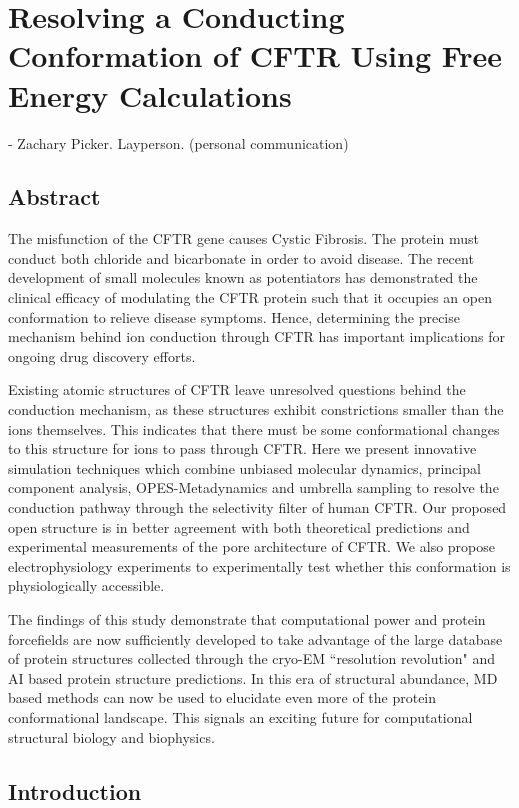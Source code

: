 \chapter{Resolving a Conducting Conformation of CFTR Using Free Energy Calculations}
\label{chap:opening}
\setcounter{figure}{0}
\renewcommand{\thefigure}{\arabic{chapter}.\arabic{figure}}
 {- Zachary Picker. Layperson. (personal communication)}


\section*{\centering Abstract} 
The misfunction of the CFTR gene causes Cystic Fibrosis. The protein must conduct both chloride and bicarbonate in order to avoid disease. The recent development of small molecules known as potentiators has demonstrated the clinical efficacy of modulating the CFTR protein such that it occupies an open conformation to relieve disease symptoms. Hence, determining the precise mechanism behind ion conduction through CFTR has important implications for ongoing drug discovery efforts.

Existing atomic structures of CFTR leave unresolved questions behind the conduction mechanism, as these structures exhibit constrictions smaller than the ions themselves. This indicates that there must be some conformational changes to this structure for ions to pass through CFTR. Here we present innovative simulation techniques which combine unbiased molecular dynamics, principal component analysis, OPES-Metadynamics and umbrella sampling to resolve the conduction pathway through the selectivity filter of human CFTR. Our proposed open structure is in better agreement with both theoretical predictions and experimental measurements of the pore architecture of CFTR. We also propose electrophysiology experiments to experimentally test whether this conformation is physiologically accessible.  

The findings of this study demonstrate that computational power and protein forcefields are now sufficiently developed to take advantage of the large database of protein structures collected through the cryo-EM ``resolution revolution" and AI based protein structure predictions. In this era of structural abundance, MD based methods can now be used to elucidate even more of the protein conformational landscape. This signals an exciting future for computational structural biology and biophysics.

\section{Introduction}

